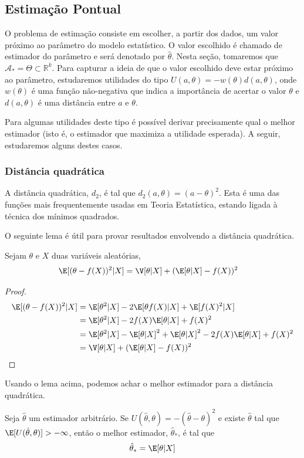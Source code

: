 \subsection{Estimação Pontual}

O problema de estimação consiste em 
escolher, a partir dos dados, 
um valor próximo ao parâmetro do modelo estatístico.
O valor escolhido é chamado de estimador do parâmetro e
será denotado por $\hat{\theta}$.
Nesta seção, tomaremos que 
$\mathcal{A}_{*} = \Theta \subset \mathbb{R}^{k}$.
Para capturar a ideia de que
o valor escolhido deve estar próximo ao parâmetro,
estudaremos utilidades do tipo 
$U(a,\theta) = -w(\theta)d(a,\theta)$,
onde $w(\theta)$ é uma função não-negativa que indica a importância de acertar o valor $\theta$ e
$d(a,\theta)$ é uma distância entre $a$ e $\theta$.

Para algumas utilidades deste tipo é possível derivar
precisamente qual o melhor estimador (isto é, o estimador que maximiza a utilidade esperada).
A seguir, estudaremos alguns destes casos.

\subsubsection{Distância quadrática}

A distância quadrática, $d_{2}$, 
é tal que $d_{2}(a,\theta) = (a-\theta)^{2}$.
Esta é uma das funções mais frequentemente usadas 
em Teoria Estatística,
estando ligada à técnica dos mínimos quadrados.

O seguinte lema é útil para 
provar resultados envolvendo 
a distância quadrática.
\begin{lemma}
 \label{lemma:conditional_l2}
 Sejam $\theta$ e $X$ 
 duas variáveis aleatórias,
 \begin{align*}
  \E[(\theta-f(X))^{2}|X]
  &= \V[\theta|X] + (\E[\theta|X]-f(X))^{2}
 \end{align*}
\end{lemma}
\begin{proof}
 \begin{align*}
  \E[(\theta-f(X))^{2}|X]
  &= \E[\theta^{2}|X] 
  -2\E[\theta f(X)|X] + \E[f(X)^{2}|X] \\
  &= \E[\theta^{2}|X] -2f(X)\E[\theta|X] + f(X)^{2} \\
  &= \E[\theta^{2}|X] -\E[\theta|X]^{2} +\E[\theta|X]^{2} 
  -2f(X)\E[\theta|X] + f(X)^{2}	\\
  &= \V[\theta|X] + (\E[\theta|X]-f(X))^{2}
 \end{align*}
\end{proof}
Usando o lema acima, podemos 
achar o melhor estimador para
a distância quadrática.
\begin{theorem}
 \label{thm:estimation_l2}
 Seja $\hat{\theta}$ um estimador arbitrário.
 Se $U(\hat{\theta},\theta) = -(\hat{\theta}-\theta)^{2}$
 e existe $\hat{\theta}$ tal que 
 $\E[U(\hat{\theta},\theta)] > -\infty$,
 então o melhor estimador, $\hat{\theta}_{*}$, 
 é tal que
 \begin{align*}
  \hat{\theta}_{*} = \E[\theta|X]
 \end{align*}
\end{theorem}

